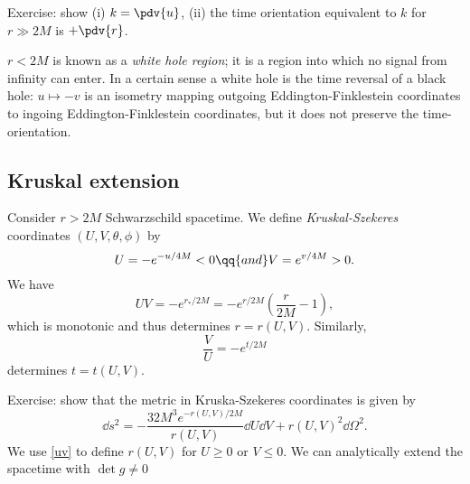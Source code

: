 \documentclass{jknotes}
\begin{document}
Exercise: show (i) \(k=\pdv{u}\), (ii) the time orientation equivalent to \(k\) for \(r\gg2M\) is \(+\pdv{r}\).

\(r<2M\) is known as a \emph{white hole region}; it is a region into which no signal from infinity can enter. In a certain sense a white hole is the time reversal of a black hole: \(u\mapsto -v\) is an isometry mapping outgoing Eddington-Finklestein coordinates to ingoing Eddington-Finklestein coordinates, but it does not preserve the time-orientation.

\subsection{Kruskal extension}
Consider \(r>2M\) Schwarzschild spacetime. We define \emph{Kruskal-Szekeres} coordinates \((U,V,\theta,\phi)\) by
\begin{equation}
    U = -e^{-u/4M} < 0
    \qq{and}
    V = e^{v/4M} > 0.
\end{equation}
We have
\begin{equation}
    UV = -e^{r_*/2M} = - e^{r/2M}\left( \frac{r}{2M} - 1 \right),
    \tag{\(**\)}
    \label{uv}
\end{equation}
which is monotonic and thus determines \(r = r(U,V)\). Similarly, 
\begin{equation}
    \frac{V}{U} = -e^{t/2M}
\end{equation}
determines \(t = t(U,V)\).

Exercise: show that the metric in Kruska-Szekeres coordinates is given by
\begin{equation}
    \dd{s}^2 = -\frac{32M^3e^{-r(U,V)/2M}}{r(U,V)} \dd{U}\dd{V} + r(U,V)^2 \dd{\Omega}^2.
\end{equation}
We use \eqref{uv} to define \(r(U,V)\) for \(U\ge0\) or \(V\le0\). We can analytically extend the spacetime with \(\det g \ne0\)
\end{document}
